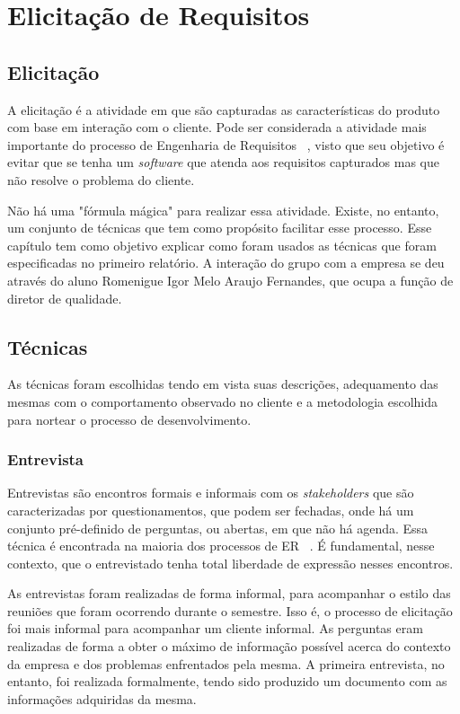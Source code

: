 \chapter{Elicitação de Requisitos}
\label{elicitation}

\section{Elicitação}

A elicitação é a atividade em que são capturadas as características do produto com base em interação com o cliente. Pode ser considerada a atividade mais importante do processo de Engenharia de Requisitos ~\cite{goguen}, visto que seu objetivo é evitar que se tenha um \textit{software} que atenda aos requisitos capturados mas que não resolve o problema do cliente. ~\cite{pressman}

Não há uma "fórmula mágica" para realizar essa atividade. Existe, no entanto, um conjunto de técnicas que tem como propósito facilitar esse processo. Esse capítulo tem como objetivo explicar como foram usados as técnicas que foram especificadas no primeiro relatório. A interação do grupo com a empresa se deu através do aluno Romenigue Igor Melo Araujo Fernandes, que ocupa a função de diretor de qualidade.

\section{Técnicas}

As técnicas foram escolhidas tendo em vista suas descrições, adequamento das mesmas com o comportamento observado no cliente e a metodologia escolhida para nortear o processo de desenvolvimento.

\subsection{Entrevista}

Entrevistas são encontros formais e informais com os \textit{stakeholders} que são caracterizadas por questionamentos, que podem ser fechadas, onde há um conjunto pré-definido de perguntas, ou abertas, em que não há agenda. Essa técnica é encontrada na maioria dos processos de ER ~\cite{sommerville}. É fundamental, nesse contexto, que o entrevistado tenha total liberdade de expressão nesses encontros.

As entrevistas foram realizadas de forma informal, para acompanhar o estilo das reuniões que foram ocorrendo durante o semestre. Isso é, o processo de elicitação foi mais informal para acompanhar um cliente informal. As perguntas eram realizadas de forma a obter o máximo de informação possível acerca do contexto da empresa e dos problemas enfrentados pela mesma. A primeira entrevista, no entanto, foi realizada formalmente, tendo sido produzido um documento com as informações adquiridas da mesma.



